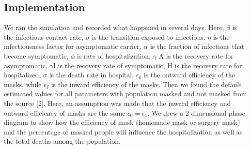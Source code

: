 \documentclass{article}
\begin{document}
\subsection{Implementation}

We ran the simulation and recorded what happened in several days. Here, $\beta$ is the infectious contact rate, $\sigma$ is the transition exposed to infectious, $\eta$ is the infectiousness factor for asymptomatic carrier, $\alpha$ is the fraction of infections that become symptomatic, $\phi$ is rate of hospitalization, $\gamma$ A is the recovery rate for asymptomatic, $\gamma$I is the recovery rate of  symptomatic, H is the recovery rate for hospitalized, $\sigma$ is the death rate in hospital, $\epsilon_{0}$ is the outward efficiency of the masks, while $\epsilon_{I}$ is the inward efficiency of the masks.
Then we found the default estimated values for all parameters with population masked and not masked from the source [2]. Here, an assumption was made that the inward efficiency and outward efficiency of masks are the same $\epsilon_{0} = \epsilon_{1}$. We drew a 2 dimensional phase diagram to show how the efficiency of mask (homemade mask or surgery mask) and the percentage of masked people will influence the hospitalization as well as the total deaths among the population.
\end{document}
